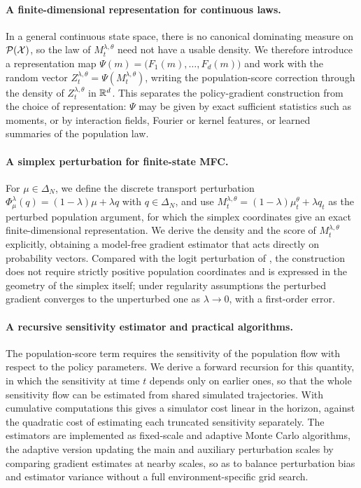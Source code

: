 \paragraph{A finite-dimensional representation for continuous laws.}
In a general continuous state space, there is no canonical dominating measure on ${\cal P}({\cal X})$, so the law of $M_t^{\lambda,\theta}$ need not have a usable density. We therefore introduce a representation map $\Psi(m)=\big(F_1(m),\ldots,F_d(m)\big)$ and work with the random vector $Z_t^{\lambda,\theta}=\Psi(M_t^{\lambda,\theta})$, writing the population-score correction through the density of $Z_t^{\lambda,\theta}$ in $\mathbb{R}^d$. This separates the policy-gradient construction from the choice of representation: $\Psi$ may be given by exact sufficient statistics such as moments, or by interaction fields, Fourier or kernel features, or learned summaries of the population law.

\paragraph{A simplex perturbation for finite-state MFC.}
For $\mu\in\Delta_N$, we define the discrete transport perturbation $\Phi_\mu^\lambda(q)=(1-\lambda)\mu+\lambda q$ with $q\in\Delta_N$, and use $M_t^{\lambda,\theta} = (1-\lambda)\mu_t^\theta+\lambda q_t$ as the perturbed population argument, for which the simplex coordinates give an exact finite-dimensional representation. We derive the density and the score of $M_t^{\lambda,\theta}$ explicitly, obtaining a model-free gradient estimator that acts directly on probability vectors. Compared with the logit perturbation of \cite{meunier2026model}, the construction does not require strictly positive population coordinates and is expressed in the geometry of the simplex itself; under regularity assumptions the perturbed gradient converges to the unperturbed one as $\lambda\to0$, with a first-order error.

\paragraph{A recursive sensitivity estimator and practical algorithms.}
The population-score term requires the sensitivity of the population flow with respect to the policy parameters. We derive a forward recursion for this quantity, in which the sensitivity at time $t$ depends only on earlier ones, so that the whole sensitivity flow can be estimated from shared simulated trajectories. With cumulative computations this gives a simulator cost linear in the horizon, against the quadratic cost of estimating each truncated sensitivity separately. The estimators are implemented as fixed-scale and adaptive Monte Carlo algorithms, the adaptive version updating the main and auxiliary perturbation scales by comparing gradient estimates at nearby scales, so as to balance perturbation bias and estimator variance without a full environment-specific grid search.


